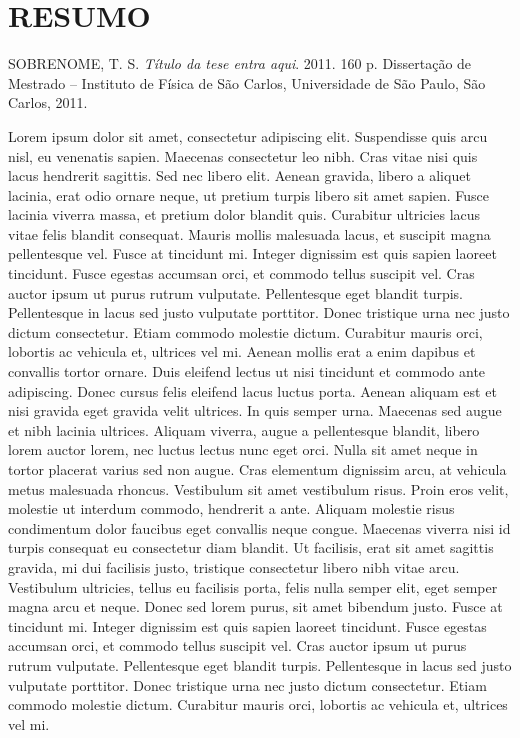 \chapter*{RESUMO}

\begin{citacaotese}
  SOBRENOME, T. S. \textit{Título da tese entra aqui}. 2011. 160
  p. Dissertação de Mestrado -- Instituto de F\'isica de S\~ao Carlos,
  Universidade de S\~ao Paulo, S\~ao Carlos, 2011.
\end{citacaotese}

\begin{resumo}
  Lorem ipsum dolor sit amet, consectetur adipiscing elit. Suspendisse
  quis arcu nisl, eu venenatis sapien. Maecenas consectetur leo
  nibh. Cras vitae nisi quis lacus hendrerit sagittis. Sed nec libero
  elit. Aenean gravida, libero a aliquet lacinia, erat odio ornare
  neque, ut pretium turpis libero sit amet sapien. Fusce lacinia
  viverra massa, et pretium dolor blandit quis. Curabitur ultricies
  lacus vitae felis blandit consequat. Mauris mollis malesuada lacus,
  et suscipit magna pellentesque vel. Fusce at tincidunt mi. Integer
  dignissim est quis sapien laoreet tincidunt. Fusce egestas accumsan
  orci, et commodo tellus suscipit vel. Cras auctor ipsum ut purus
  rutrum vulputate. Pellentesque eget blandit turpis. Pellentesque in
  lacus sed justo vulputate porttitor. Donec tristique urna nec justo
  dictum consectetur. Etiam commodo molestie dictum. Curabitur mauris
  orci, lobortis ac vehicula et, ultrices vel mi. Aenean mollis erat a
  enim dapibus et convallis tortor ornare. Duis eleifend lectus ut
  nisi tincidunt et commodo ante adipiscing. Donec cursus felis
  eleifend lacus luctus porta. Aenean aliquam est et nisi gravida eget
  gravida velit ultrices. In quis semper urna. Maecenas sed augue et
  nibh lacinia ultrices. Aliquam viverra, augue a pellentesque
  blandit, libero lorem auctor lorem, nec luctus lectus nunc eget
  orci. Nulla sit amet neque in tortor placerat varius sed non
  augue. Cras elementum dignissim arcu, at vehicula metus malesuada
  rhoncus. Vestibulum sit amet vestibulum risus. Proin eros velit,
  molestie ut interdum commodo, hendrerit a ante. Aliquam molestie
  risus condimentum dolor faucibus eget convallis neque
  congue. Maecenas viverra nisi id turpis consequat eu consectetur
  diam blandit. Ut facilisis, erat sit amet sagittis gravida, mi dui
  facilisis justo, tristique consectetur libero nibh vitae
  arcu. Vestibulum ultricies, tellus eu facilisis porta, felis nulla
  semper elit, eget semper magna arcu et neque. Donec sed lorem purus,
  sit amet bibendum justo. Fusce at tincidunt mi. Integer dignissim
  est quis sapien laoreet tincidunt. Fusce egestas accumsan orci, et
  commodo tellus suscipit vel. Cras auctor ipsum ut purus rutrum
  vulputate. Pellentesque eget blandit turpis. Pellentesque in lacus
  sed justo vulputate porttitor. Donec tristique urna nec justo dictum
  consectetur. Etiam commodo molestie dictum. Curabitur mauris orci,
  lobortis ac vehicula et, ultrices vel mi.
\end{resumo}

